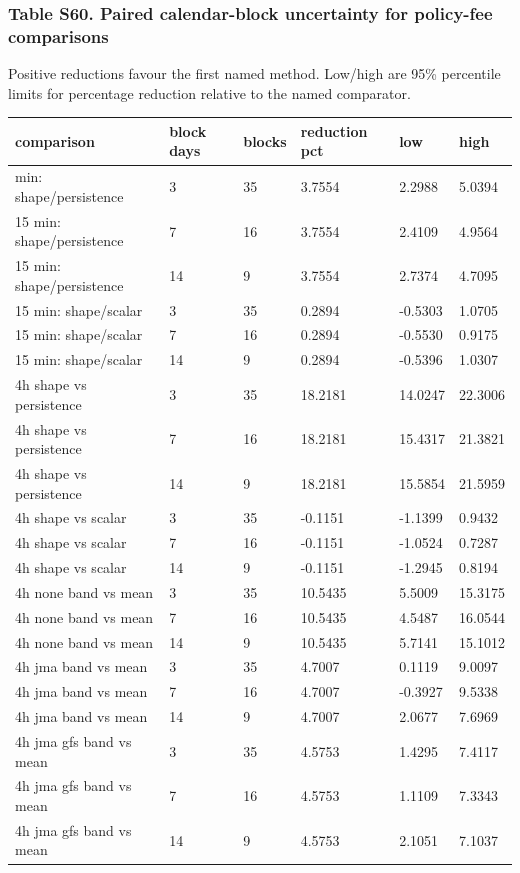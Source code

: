 \documentclass[a4paper,11pt]{article}
\newcounter{none}
\begin{document}
\subsubsection{Table S60. Paired calendar-block uncertainty for policy-fee comparisons}\label{table-s60.-paired-calendar-block-uncertainty-for-policy-fee-comparisons}

Positive reductions favour the first named method. Low/high are 95\% percentile limits for percentage reduction relative to the named comparator.

{\def\LTcaptype{none} %
\begin{longtable}[]{@{}llllll@{}}
\toprule\noalign{}
comparison & block days & blocks & reduction pct & low & high \\
\midrule\noalign{}
\endhead
\bottomrule\noalign{}
\endlastfoot
15 min: shape/persistence & 3 & 35 & 3.7554 & 2.2988 & 5.0394 \\
15 min: shape/persistence & 7 & 16 & 3.7554 & 2.4109 & 4.9564 \\
15 min: shape/persistence & 14 & 9 & 3.7554 & 2.7374 & 4.7095 \\
15 min: shape/scalar & 3 & 35 & 0.2894 & -0.5303 & 1.0705 \\
15 min: shape/scalar & 7 & 16 & 0.2894 & -0.5530 & 0.9175 \\
15 min: shape/scalar & 14 & 9 & 0.2894 & -0.5396 & 1.0307 \\
4h shape vs persistence & 3 & 35 & 18.2181 & 14.0247 & 22.3006 \\
4h shape vs persistence & 7 & 16 & 18.2181 & 15.4317 & 21.3821 \\
4h shape vs persistence & 14 & 9 & 18.2181 & 15.5854 & 21.5959 \\
4h shape vs scalar & 3 & 35 & -0.1151 & -1.1399 & 0.9432 \\
4h shape vs scalar & 7 & 16 & -0.1151 & -1.0524 & 0.7287 \\
4h shape vs scalar & 14 & 9 & -0.1151 & -1.2945 & 0.8194 \\
4h none band vs mean & 3 & 35 & 10.5435 & 5.5009 & 15.3175 \\
4h none band vs mean & 7 & 16 & 10.5435 & 4.5487 & 16.0544 \\
4h none band vs mean & 14 & 9 & 10.5435 & 5.7141 & 15.1012 \\
4h jma band vs mean & 3 & 35 & 4.7007 & 0.1119 & 9.0097 \\
4h jma band vs mean & 7 & 16 & 4.7007 & -0.3927 & 9.5338 \\
4h jma band vs mean & 14 & 9 & 4.7007 & 2.0677 & 7.6969 \\
4h jma gfs band vs mean & 3 & 35 & 4.5753 & 1.4295 & 7.4117 \\
4h jma gfs band vs mean & 7 & 16 & 4.5753 & 1.1109 & 7.3343 \\
4h jma gfs band vs mean & 14 & 9 & 4.5753 & 2.1051 & 7.1037 \\
\end{longtable}
}
\end{document}
